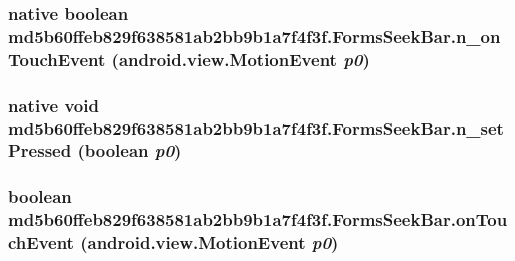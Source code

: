 \hypertarget{classmd5b60ffeb829f638581ab2bb9b1a7f4f3f_1_1_forms_seek_bar_a4dc7163026ee545dc2829db5cacddcb}{
\subsubsection[{n\_\-onTouchEvent}]{\setlength{\rightskip}{0pt plus 5cm}native boolean md5b60ffeb829f638581ab2bb9b1a7f4f3f.FormsSeekBar.n\_\-onTouchEvent (android.view.MotionEvent {\em p0})}}
\label{classmd5b60ffeb829f638581ab2bb9b1a7f4f3f_1_1_forms_seek_bar_a4dc7163026ee545dc2829db5cacddcb}


\hypertarget{classmd5b60ffeb829f638581ab2bb9b1a7f4f3f_1_1_forms_seek_bar_43c91a743f795b460a3a27e8690d828a}{
\subsubsection[{n\_\-setPressed}]{\setlength{\rightskip}{0pt plus 5cm}native void md5b60ffeb829f638581ab2bb9b1a7f4f3f.FormsSeekBar.n\_\-setPressed (boolean {\em p0})}}
\label{classmd5b60ffeb829f638581ab2bb9b1a7f4f3f_1_1_forms_seek_bar_43c91a743f795b460a3a27e8690d828a}


\hypertarget{classmd5b60ffeb829f638581ab2bb9b1a7f4f3f_1_1_forms_seek_bar_2a80911e4812d35846f878170806ba84}{
\subsubsection[{onTouchEvent}]{\setlength{\rightskip}{0pt plus 5cm}boolean md5b60ffeb829f638581ab2bb9b1a7f4f3f.FormsSeekBar.onTouchEvent (android.view.MotionEvent {\em p0})}}
\label{classmd5b60ffeb829f638581ab2bb9b1a7f4f3f_1_1_forms_seek_bar_2a80911e4812d35846f878170806ba84}


